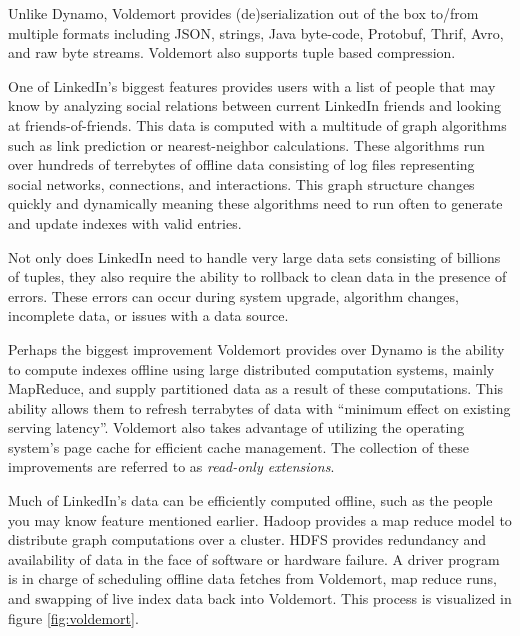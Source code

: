 \documentclass[]{article}
\begin{document}
Unlike Dynamo, Voldemort provides (de)serialization out of the box to/from multiple formats including JSON, strings, Java byte-code, Protobuf, Thrif, Avro, and raw byte streams. Voldemort also supports tuple based compression.

One of LinkedIn's biggest features provides users with a list of people that may know by analyzing social relations between current LinkedIn friends and looking at friends-of-friends. This data is computed with a multitude of graph algorithms such as link prediction or nearest-neighbor calculations. These algorithms run over hundreds of terrebytes of offline data consisting of log files representing social networks, connections, and interactions. This graph structure changes quickly and dynamically meaning these algorithms need to run often to generate and update indexes with valid entries. 

Not only does LinkedIn need to handle very large data sets consisting of billions of tuples, they also require the ability to rollback to clean data in the presence of errors. These errors can occur during system upgrade, algorithm changes, incomplete data, or issues with a data source.

Perhaps the biggest improvement Voldemort provides over Dynamo is the ability to compute indexes offline using large distributed computation systems, mainly MapReduce, and supply partitioned data as a result of these computations. This ability allows them to refresh terrabytes of data with ``minimum effect on existing serving latency''. Voldemort also takes advantage of utilizing the operating system's page cache for efficient cache management. The collection of these improvements are referred to as \textit{read-only extensions}.

Much of LinkedIn's data can be efficiently computed offline, such as the people you may know feature mentioned earlier. Hadoop provides a map reduce model to distribute graph computations over a cluster. HDFS provides redundancy and availability of data in the face of software or hardware failure. A driver program is in charge of scheduling offline data fetches from Voldemort, map reduce runs, and swapping of live index data back into Voldemort. This process is visualized in figure \ref{fig:voldemort}. 
\end{document}
